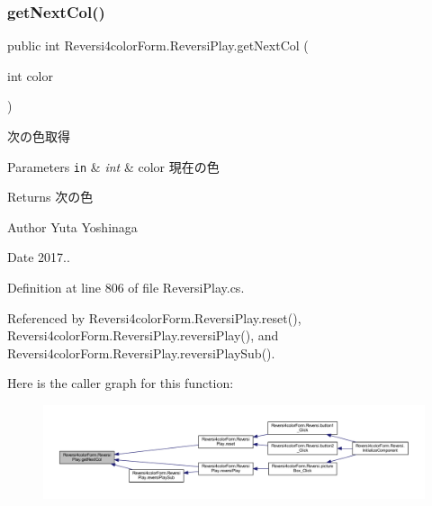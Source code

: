 \subsubsection{\texorpdfstring{get\+Next\+Col()}{getNextCol()}}
{\footnotesize\ttfamily public int Reversi4color\+Form.\+Reversi\+Play.\+get\+Next\+Col (\begin{DoxyParamCaption}\item[{int}]{color }\end{DoxyParamCaption})}



次の色取得 


\begin{DoxyParams}[1]{Parameters}
\mbox{\tt in}  & {\em int} & color 現在の色 \\
\hline
\end{DoxyParams}
\begin{DoxyReturn}{Returns}
次の色 
\end{DoxyReturn}
\begin{DoxyAuthor}{Author}
Yuta Yoshinaga 
\end{DoxyAuthor}
\begin{DoxyDate}{Date}
2017.. 
\end{DoxyDate}


Definition at line 806 of file Reversi\+Play.\+cs.



Referenced by Reversi4color\+Form.\+Reversi\+Play.\+reset(), Reversi4color\+Form.\+Reversi\+Play.\+reversi\+Play(), and Reversi4color\+Form.\+Reversi\+Play.\+reversi\+Play\+Sub().

Here is the caller graph for this function\+:\nopagebreak
\begin{figure}[H]
\begin{center}
\leavevmode
\includegraphics[width=350pt]{class_reversi4color_form_1_1_reversi_play_a037f282ad4aeb2807a0108cbbb82fd02_icgraph}
\end{center}
\end{figure}
\mbox{\label{class_reversi4color_form_1_1_reversi_play_a32c01f1f57a7413cd5173637800f74b7}} 

